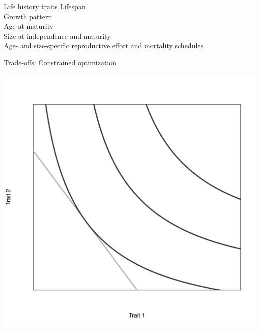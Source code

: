 \documentclass{beamer}
\begin{document}
\begin{frame}{Life history traits}
Lifespan\\
\vspace{1cm}
\pause
Growth pattern\\
\vspace{1cm}
\pause
Age at maturity\\
\pause
\vspace{1cm}
Size at independence and maturity\\
\pause
\vspace{1cm}
Age- and size-specific reproductive effort and mortality schedules\\
\end{frame}

\begin{frame}{Trade-offs: Constrained optimization}
  \begin{center}
    \includegraphics[width=.7\textwidth]{constrained_optimization.pdf}\
  \end{center}
\end{frame}
\end{document}
